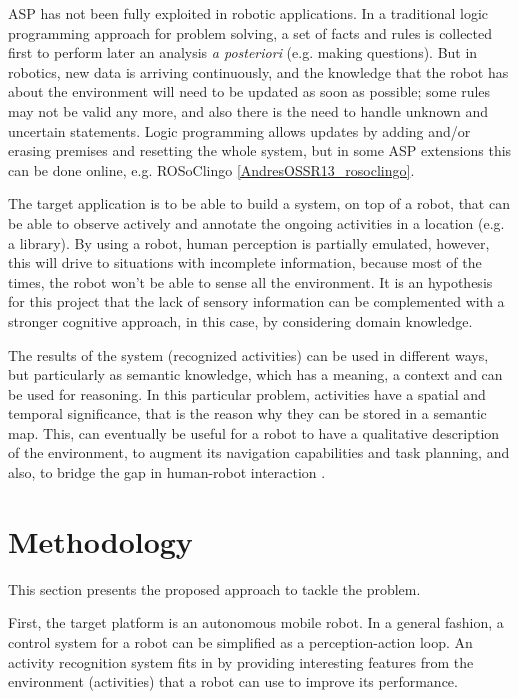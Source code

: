 ASP has not been fully exploited in robotic applications.
In a traditional logic programming approach for problem solving, a set of facts and rules is collected first to perform later an analysis \textit{a posteriori} (e.g. making questions).
But in robotics, new data is arriving continuously, and the knowledge that the robot has about the environment will need to be updated as soon as possible; some rules may not be valid any more, and also there is the need to handle unknown and uncertain statements.
Logic programming allows updates by adding and/or erasing premises and resetting the whole system, but in some ASP extensions this can be done online, e.g. ROSoClingo \ref{AndresOSSR13_rosoclingo}.

The target application is to be able to build a system, on top of a robot, that can be able to observe actively and annotate the ongoing activities in a location (e.g. a library). 
By using a robot, human perception is partially emulated, however, this will drive to situations with incomplete information, because most of the times, the robot won't be able to sense all the environment. 
It is an hypothesis for this project that the lack of sensory information can be complemented with a stronger cognitive approach, in this case, by considering domain knowledge.

The results of the system (recognized activities) can be used in different ways, but particularly as semantic knowledge, which has a meaning, a context and can be used for reasoning.
In this particular problem, activities have a spatial and temporal significance, that is the reason why they can be stored in a semantic map.
This, can eventually be useful for a robot to have a qualitative description of the environment, to augment its navigation capabilities and task planning, and also, to bridge the gap in human-robot interaction \citep{Kostavelis2015_SemMapSurv}.



\section{Methodology}

This section presents the proposed approach to tackle the problem.

First, the target platform is an autonomous mobile robot.
In a general fashion, a control system for a robot can be simplified as a perception-action loop. %
An activity recognition system fits in by providing interesting features from the environment (activities) that a robot can use to improve its performance.

